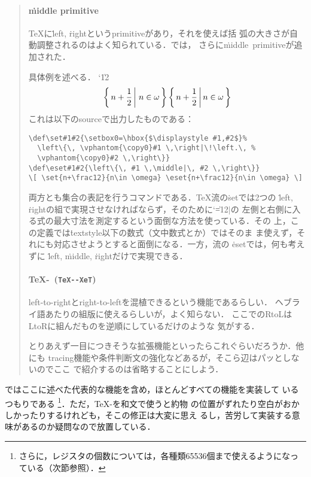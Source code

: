\documentclass[a4paper,11pt,nomag]{jsarticle}
\def\TeXXeT{\TeX-\reflectbox{\bfseries\TeX-}}
\begin{document}
\begin{quotation}
\paragraph{\.{middle} primitive}
\TeX に\.{left}, \.{right}というprimitiveがあり，それを使えば括
弧の大きさが自動調整されるのはよく知られている．\eTeX では，
さらに\.{middle}\ primitiveが追加された．

具体例を述べる．
{\catcode`\|12
\def\set#1#2{\setbox0=\hbox{$\displaystyle #1,#2$}%
\left\{\, \vphantom{\copy0}#1 \,\right|\!\left.\, \vphantom{\copy0}#2 \,\right\}}
\def\eset#1#2{\left\{\, #1 \,\middle|\, #2 \,\right\}}
\[ \set{n+\frac12}{n\in \omega} \eset{n+\frac12}{n\in \omega} \]}
これは以下のsourceで出力したものである：

{\narrowbaselines
\begin{verbatim}
\def\set#1#2{\setbox0=\hbox{$\displaystyle #1,#2$}%
  \left\{\, \vphantom{\copy0}#1 \,\right|\!\left.\, %
  \vphantom{\copy0}#2 \,\right\}}
\def\eset#1#2{\left\{\, #1 \,\middle|\, #2 \,\right\}}
\[ \set{n+\frac12}{n\in \omega} \eset{n+\frac12}{n\in \omega} \]
\end{verbatim}}
両方とも集合の表記を行うコマンドである．\TeX 流の\.{set}では2つの
\.{left}, \.{right}の組で実現させなければならず，そのために{\catcode`\|=12$|$}の
左側と右側に入る式の最大寸法を測定するという面倒な方法を使っている．その
上，この定義では\.{textstyle}以下の数式（文中数式とか）ではそのま
ま使えず，それにも対応させようとすると面倒になる．一方，\eTeX 流の
\.{eset}では，何も考えずに
\.{left}, \.{middle}, \.{right}だけで実現できる．

\paragraph{\TeXXeT\ \textmd{(\texttt{TeX-{}-XeT})}}
left-to-rightとright-to-leftを混植できるという機能であるらしい．
ヘブライ語あたりの組版に使えるらしいが，よく知らない．
ここでのRtoLはLtoRに組んだものを逆順にしているだけのような
気がする．

\medskip

とりあえず一目につきそうな拡張機能といったらこれぐらいだろうか．他にも
tracing機能や条件判断文の強化などあるが，そこら辺はパッとしないのでここ
で紹介するのは省略することにしよう．
\end{quotation}

\epTeX ではここに述べた代表的な機能を含め，ほとんどすべての機能を実装して
いるつもりである
\footnote{%
  さらに，レジスタの個数については，各種類65536個まで使えるようになっている（次節参照）．
}．ただ，\TeXXeT を和文で使うと約物
の位置がずれたり空白がおかしかったりするけれども，そこの修正は大変に思え
るし，苦労して実装する意味があるのか疑問なので放置している．
\end{document}

